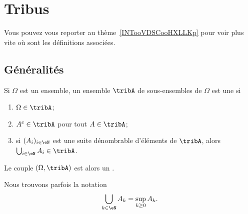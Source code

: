 
\section{Tribus}

Vous pouvez vous reporter au thème~\ref{INTooVDSCooHXLLKp} pour voir plus vite où sont les définitions associées.

\subsection{Généralités}

\begin{definition}  \label{DefjRsGSy}
	Si \( \Omega\) est un ensemble, un ensemble \( \tribA\) de sous-ensembles de \( \Omega\) est une  si
	\begin{enumerate}
		\item
		      \( \Omega\in\tribA\);
		\item		\label{ITEMooSUOYooUvgjRG}
		      \( A^c\in \tribA\) pour tout \( A\in\tribA\);
		\item       \label{ItemooPEQNooYiYNtN}
		      si \( (A_i)_{i\in \eN}\) est une suite dénombrable d'éléments de \( \tribA\), alors \( \bigcup_{i\in \eN}A_i\in\tribA\).
	\end{enumerate}
	Le couple \( (\Omega,\tribA)\) est alors un .
\end{definition}

\begin{remark}
	Nous trouvons parfois la notation
	\begin{equation}
		\bigcup_{k\in \eN}A_k=\sup_{k\geq 0}A_k.
	\end{equation}
\end{remark}


